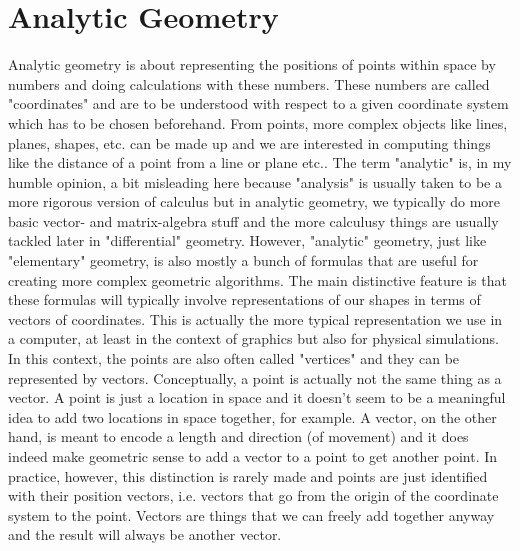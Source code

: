 \section{Analytic Geometry}
Analytic geometry is about representing the positions of points within space by numbers and doing calculations with these numbers. These numbers are called "coordinates" and are to be understood with respect to a given coordinate system which has to be chosen beforehand. From points, more complex objects like lines, planes, shapes, etc. can be made up and we are interested in computing things like the distance of a point from a line or plane etc.. The term "analytic" is, in my humble opinion, a bit misleading here because "analysis" is usually taken to be a more rigorous version of calculus but in analytic geometry, we typically do more basic vector- and matrix-algebra stuff and the more calculusy things are usually tackled later in "differential" geometry. However, "analytic" geometry, just like "elementary" geometry, is also mostly a bunch of formulas that are useful for creating more complex geometric algorithms. The main distinctive feature is that these formulas will typically involve representations of our shapes in terms of vectors of coordinates. This is actually the more typical representation we use in a computer, at least in the context of graphics but also for physical simulations. In this context, the points are also often called "vertices" and they can be represented by vectors. Conceptually, a point is actually not the same thing as a vector. A point is just a location in space and it doesn't seem to be a meaningful idea to add two locations in space together, for example. A vector, on the other hand, is meant to encode a length and direction (of movement) and it does indeed make geometric sense to add a vector to a point to get another point. In practice, however, this distinction is rarely made and points are just identified with their position vectors, i.e. vectors that go from the origin of the coordinate system to the point. Vectors are things that we can freely add together anyway and the result will always be another vector.


